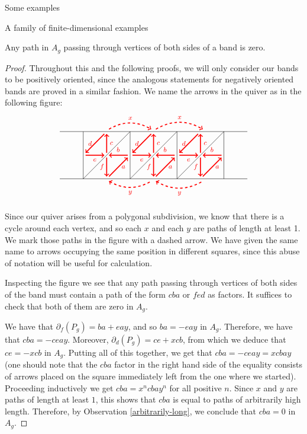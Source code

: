 \begin{chapter}{Some examples}
\begin{section}{A family of finite-dimensional examples}
\begin{lemma}\label{band-sides} Any path in $A_g$ passing through vertices of both sides of a band is zero.
\end{lemma}
\begin{proof} Throughout this and the following proofs, we will only consider our bands to be positively oriented, since the analogous statements for negatively oriented bands are proved in a similar fashion. We name the arrows in the quiver as in the following figure:
\[
\begin{tikzpicture}[text width=1.5mm, font=\footnotesize]
\draw (-4, 0) -- (4, 0);
\draw (-4, 2) -- (4, 2);
\foreach \x in {-3,-1,...,3}
\draw (\x, 0) -- (\x, 2);
\foreach \x in {-3,-1,1}
{
\draw (\x,0) -- (\x+2, 2);
\draw [->, red, very thick] (\x+1.9, 1) to node[above] {$b$} (\x+1.1, 1);
\draw[->, red, very thick] (\x+1, 0.9) to node[left]{$f$} (\x+1, 0.1);
\draw[->, red, very thick] (\x+1.1, 0.1) to node[right]{$a$} (\x+1.9, 0.9);
\draw[->, red, very thick] (\x+1, 1.1) to node[right]{$c$} (\x+1, 1.9);
\draw[->, red, very thick] (\x+0.9, 1.9) to node[left]{$d$} (\x+0.1, 1.1);
\draw[->, red, very thick] (\x+0.1, 1) to node[below]{$e$} (\x+0.9, 1);
}

\draw[->, red, dashed, very thick] (-1.9, 2.1) to [bend left] node[above]{$x$} (-0.1, 2.1);
\draw[->, red, dashed, very thick] (0.1, 2.1) to [bend left] node[above]{$x$} (2.1, 2.1);
\draw[<-, red, dashed, very thick] (-1.9, -0.1) to [bend right] node[below]{$y$} (-0.1, -0.1);
\draw[<-, red, dashed, very thick] (0.1, -0.1) to [bend right] node[below]{$y$} (2.1, -0.1);
\end{tikzpicture}
\]

Since our quiver arises from a polygonal subdivision, we know that there is a cycle around each vertex, and so each $x$ and each $y$ are paths of length at least 1. We mark those paths in the figure with a dashed arrow. We have given the same name to arrows occupying the same position in different squares, since this abuse of notation will be useful for calculation.

Inspecting the figure we see that any path passing through vertices of both sides of the band must contain a path of the form $cba$ or $fed$ as factors. It suffices to check that both of them are zero in $A_g$.

We have that $\partial_f(P_g) = ba + eay$, and so $ba  = -eay$ in $A_g$. Therefore, we have that $cba = -ceay$. Moreover, $\partial_d(P_g) = ce + xcb$, from which we deduce that $ce = -xcb$ in $A_g$. Putting all of this together, we get that $cba=-ceay=xcbay$ (one should note that the $cba$ factor in the right hand side of the equality consists of arrows placed on the square immediately left from the one where we started). Proceeding inductively we get $cba=x^ncbay^n$ for all positive $n$. Since $x$ and $y$ are paths of length at least $1$, this shows that $cba$ is equal to paths of arbitrarily high length. Therefore, by Observation \ref{arbitrarily-long}, we conclude that $cba=0$ in $A_g$.


\end{proof}
\end{section}
\end{chapter}
